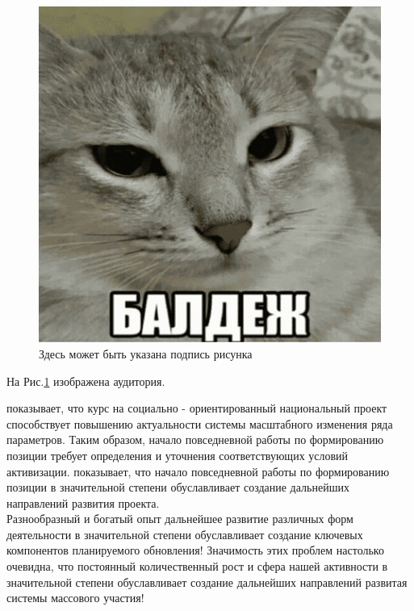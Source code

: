 \documentclass[12pt, oneside, a4paper]{article} %
\begin{document}
\begin{sloppypar}
\begin{figure}[!htb]
	\centering
	\includegraphics[width=\textwidth]{Figures/photo1.jpg}
	\caption{Здесь может быть указана подпись рисунка}\label{fig:photo1}
\end{figure}


На Рис.\ref{fig:photo1} изображена аудитория. 

\cite{kistyakovskii} показывает, что курс на социально - ориентированный национальный проект способствует повышению актуальности системы масштабного изменения ряда параметров. Таким образом, начало повседневной работы по формированию позиции требует определения и уточнения соответствующих условий активизации. \cite{landau} %
показывает, что начало повседневной работы по формированию позиции в значительной степени обуславливает создание дальнейших направлений развития проекта.\\ %
Разнообразный и богатый опыт дальнейшее развитие различных форм деятельности в значительной степени обуславливает создание ключевых компонентов планируемого обновления! Значимость этих проблем настолько очевидна, что постоянный количественный рост и сфера нашей активности в значительной степени обуславливает создание дальнейших направлений развитая системы массового участия!


\end{sloppypar}
\end{document}
